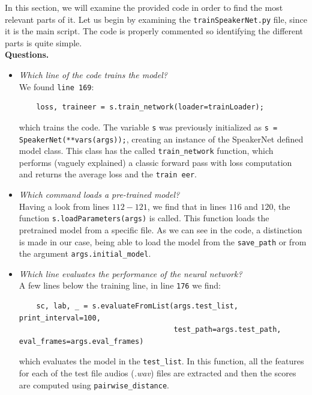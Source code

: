 \documentclass[a4paper]{article}
\def\inline{\lstinline[basicstyle=\ttfamily,keywordstyle={}]}
\begin{document}
In this section, we will examine the provided code in order to find the most relevant parts of it. Let us begin by examining the \inline{trainSpeakerNet.py} file, since it is the main script. The code is properly commented so identifying the different parts is quite simple.\\

\textbf{Questions.}\\

\begin{itemize}
  \item \emph{Which line of the code trains the model?}\\

        We found \inline{line 169}:
        \begin{verbatim}
    loss, traineer = s.train_network(loader=trainLoader);
  \end{verbatim}
        which trains the code. The variable \inline{s} was previously initialized as \inline{s = SpeakerNet(**vars(args));}, creating an instance of the SpeakerNet defined model class. This class has the called \inline{train_network} function, which performs (vaguely explained) a classic forward pass with loss computation and returns the average loss and the \inline{train eer}.

  \item \emph{Which command loads a pre-trained model?}\\

        Having a look from lines \(112-121\), we find that in lines \(116\) and \(120\), the function \inline{s.loadParameters(args)} is called. This function loads the pretrained model from a specific file. As we can see in the code, a distinction is made in our case, being able to load the model from the \inline{save_path} or from the argument \inline{args.initial_model}.
  \item \emph{Which line evaluates the performance of the neural network?}\\

        A few lines below the training line, in line \inline{176} we find:
        \begin{verbatim}
    sc, lab, _ = s.evaluateFromList(args.test_list, print_interval=100,
                                    test_path=args.test_path, eval_frames=args.eval_frames)
  \end{verbatim}
        which evaluates the model in the \inline{test_list}. In this function, all the features for each of the test file audios (\emph{.wav}) files are extracted and then the scores are computed using \inline{pairwise_distance}.


\end{itemize}
\end{document}
